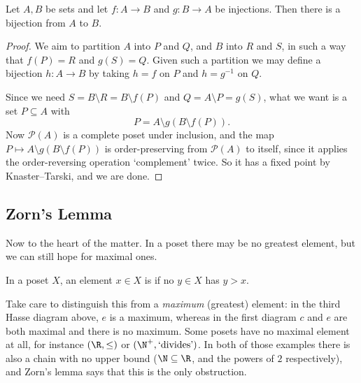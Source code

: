 \begin{corollary}\label{cor:csb}
  Let $A, B$ be sets and let $f: A \rightarrow B$ and $g: B \rightarrow A$ be injections. Then there is a bijection from $A$ to $B$.
\end{corollary}
\begin{proof}
  We aim to partition $A$ into $P$ and $Q$, and $B$ into $R$ and $S$, in such a way that $f(P) = R$ and $g(S) = Q$. Given such a partition we may define a bijection $h : A \to B$ by taking $h = f$ on $P$ and $h = g^{-1}$ on $Q$.
  \begin{center}
  \end{center}
  Since we need $S = B\setminus R = B \setminus f(P)$ and $Q = A \setminus P = g(S)$, what we want is a set $P \subseteq A$ with
  $$
    P = A\setminus g(B\setminus f(P)).
  $$
  Now $\mathcal{P}(A)$ is a complete poset under inclusion, and the map $P \mapsto A\setminus g(B\setminus f(P))$ is order-preserving from $\mathcal{P}(A)$ to itself, since it applies the order-reversing operation `complement' twice. So it has a fixed point by Knaster--Tarski, and we are done.
\end{proof}

\subsection{Zorn's Lemma}

Now to the heart of the matter. In a poset there may be no greatest element, but we can still hope for maximal ones.

\begin{definition}
  In a poset $X$, an element $x \in X$ is  if no $y \in X$ has $y > x$.
\end{definition}

Take care to distinguish this from a \emph{maximum} (greatest) element: in the third Hasse diagram above, $e$ is a maximum, whereas in the first diagram $c$ and $e$ are both maximal and there is no maximum. Some posets have no maximal element at all, for instance $(\R, \leq)$ or $(\N^+, \text{`divides'})$. In both of those examples there is also a chain with no upper bound ($\N \subseteq \R$, and the powers of $2$ respectively), and Zorn's lemma says that this is the only obstruction.

